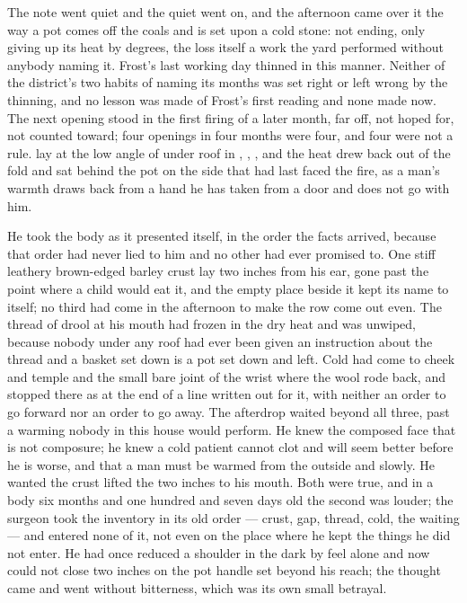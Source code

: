 The note went quiet and the quiet went on, and the afternoon came over it the way a pot comes off the coals and is set upon a cold stone: not ending, only giving up its heat by degrees, the loss itself a work the yard performed without anybody naming it. Frost's last working day thinned in this manner. Neither of the district's two habits of naming its months was set right or left wrong by the thinning, and no lesson was made of Frost's first reading and none made now. The next opening stood in the first firing of a later month, far off, not hoped for, not counted toward; four openings in four months were four, and four were not a rule.  lay at the low angle of  under  roof in , , , and the heat drew back out of the fold and sat behind the pot on the side that had last faced the fire, as a man's warmth draws back from a hand he has taken from a door and does not go with him.

He took the body as it presented itself, in the order the facts arrived, because that order had never lied to him and no other had ever promised to. One stiff leathery brown-edged barley crust lay two inches from his ear, gone past the point where a child would eat it, and the empty place beside it kept its name to itself; no third had come in the afternoon to make the row come out even. The thread of drool at his mouth had frozen in the dry heat and was unwiped, because nobody under any roof had ever been given an instruction about the thread and a basket set down is a pot set down and left. Cold had come to cheek and temple and the small bare joint of the wrist where the wool rode back, and stopped there as at the end of a line written out for it, with neither an order to go forward nor an order to go away. The afterdrop waited beyond all three, past a warming nobody in this house would perform. He knew the composed face that is not composure; he knew a cold patient cannot clot and will seem better before he is worse, and that a man must be warmed from the outside and slowly. He wanted the crust lifted the two inches to his mouth. Both were true, and in a body six months and one hundred and seven days old the second was louder; the surgeon took the inventory in its old order --- crust, gap, thread, cold, the waiting --- and entered none of it, not even on the place where he kept the things he did not enter. He had once reduced a shoulder in the dark by feel alone and now could not close two inches on the pot handle set beyond his reach; the thought came and went without bitterness, which was its own small betrayal.

